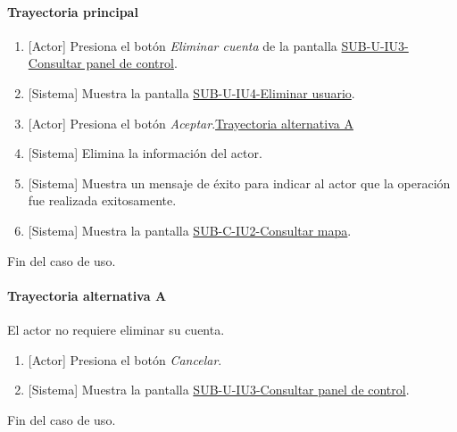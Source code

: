 \paragraph{Trayectoria principal}
	\begin{enumerate}
		\item {[Actor]} Presiona el botón \textit{Eliminar cuenta} de la pantalla \hyperref[fig:sub-u-iu3]{SUB-U-IU3-Consultar panel de control}.
		\item {[Sistema]} Muestra la pantalla \hyperref[fig:sub-u-iu4]{SUB-U-IU4-Eliminar usuario}.
		\item {[Actor]} Presiona el botón \textit{Aceptar}.\hyperref[SUB-U-CU4:TA]{Trayectoria alternativa A}
		\item {[Sistema]} Elimina la información del actor.
		\item {[Sistema]} Muestra un mensaje de éxito para indicar al actor que la operación fue realizada exitosamente.
		\item \label{SUB-U-CU4:Pantalla} {[Sistema]} Muestra la pantalla \hyperref[fig:sub-c-iu2]{SUB-C-IU2-Consultar mapa}.
	\end{enumerate}
	Fin del caso de uso.

\paragraph{Trayectoria alternativa A} \label{SUB-U-CU4:TA}
	El actor no requiere eliminar su cuenta.
	\begin{enumerate}[label=A\arabic*.]
		\item {[Actor]} Presiona el botón \textit{Cancelar}.
		\item {[Sistema]} Muestra la pantalla \hyperref[fig:sub-u-iu3]{SUB-U-IU3-Consultar panel de control}.
	\end{enumerate}
	Fin del caso de uso.


